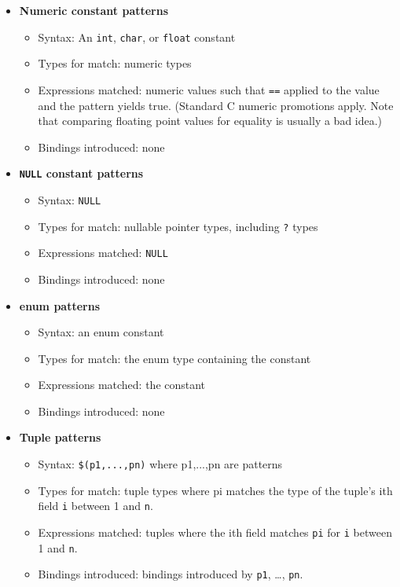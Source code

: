 \begin{itemize}
\item \textbf{Numeric constant patterns}
  \begin{itemize}
  \item Syntax: An \texttt{int}, \texttt{char}, or \texttt{float} constant
  \item Types for match: numeric types
  \item Expressions matched: numeric values such that \texttt{==}
    applied to the value and the pattern yields true.  (Standard C
    numeric promotions apply.  Note that comparing floating point
    values for equality is usually a bad idea.)
  \item Bindings introduced: none
  \end{itemize}
  
\item \textbf{\texttt{NULL} constant patterns}
  \begin{itemize}
  \item Syntax: \texttt{NULL}
  \item Types for match: nullable pointer types, including \texttt{?} types
  \item Expressions matched: \texttt{NULL}
  \item Bindings introduced: none
  \end{itemize}
  
\item \textbf{enum patterns}
  \begin{itemize}
  \item Syntax: an enum constant
  \item Types for match: the enum type containing the constant
  \item Expressions matched: the constant
  \item Bindings introduced: none
  \end{itemize}
  
\item \textbf{Tuple patterns}
  \begin{itemize}
  \item Syntax: \texttt{\$(p1,...,pn)} where p1,...,pn are patterns
  \item Types for match: tuple types where pi matches the type of the
    tuple's ith field \texttt{i} between 1 and \texttt{n}.
  \item Expressions matched: tuples where the ith field matches \texttt{pi} for
    \texttt{i} between 1 and \texttt{n}.
  \item Bindings introduced: bindings introduced by \texttt{p1}, \ldots,
    \texttt{pn}.
  \end{itemize}
  

\end{itemize}
